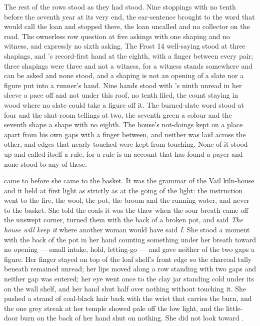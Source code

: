 The rest of the rows stood as they had stood. Nine stoppings with no tenth before the seventh year at its very end, the ear-sentence brought to the word that would call the loan and stopped there, the loan uncalled and no collector on the road. The ownerless row question at five askings with one shaping and no witness, and expressly no sixth asking. The Frost 14 well-saying stood at three shapings, and 's record-first hand at the eighth, with a finger between every pair; three shapings were three and not a witness, for a witness stands somewhere and can be asked and none stood, and a shaping is not an opening of a slate nor a figure put into a runner's hand. Nine hands stood with 's ninth unread in her sleeve a pace off and not under this roof, no tenth filed, the count staying in wood where no slate could take a figure off it. The burned-slate word stood at four and the shut-room tellings at two, the seventh green a colour and the seventh shape a shape with no eighth. The house's not-doings kept on a place apart from his own gaps with a finger between, and neither was laid across the other, and edges that nearly touched were kept from touching. None of it stood up and called itself a rule, for a rule is an account that has found a payer and none stood to any of these.

\scenebreak

 came to  before she came to the basket. It was the grammar of the Vail kiln-house and it held at first light as strictly as at the going of the light: the instruction went to the fire, the wool, the pot, the broom and the running water, and never to the basket. She told the coals it was the thaw when the sour breath came off the unswept corner, turned them with the back of a broken pot, and said \emph{The house will keep it} where another woman would have said \emph{I}. She stood a moment with the back of the pot in her hand counting something under her breath toward no opening --- small intake, hold, letting-go --- and gave neither of the two gaps a figure. Her finger stayed on top of the loaf shelf's front edge so the charcoal tally beneath remained unread; her lips moved along a row standing with two gaps and neither gap was entered; her eye went once to the clay jar standing cold under its  on the wall shelf, and her hand shut half over nothing without touching it. She pushed a strand of coal-black hair back with the wrist that carries the burn, and the one grey streak at her temple showed pale off the low light, and the little-door burn on the back of her hand shut on nothing. She did not look toward .

